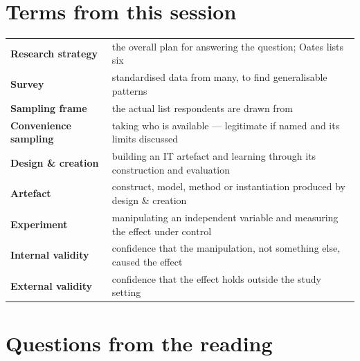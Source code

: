 \documentclass[11pt,a4paper,british,twoside=false,headings=small,chapterprefix=false,numbers=noenddot]{scrbook}
\begin{document}
\section*{Terms from this session}
\begin{center}\small
\footnotesize
  \renewcommand{\arraystretch}{1.18}
  \begin{tabular}{@{}p{3.6cm}p{9.9cm}@{}}
    \toprule
    \textbf{Research strategy} & the overall plan for answering the question; Oates lists six\\
    \textbf{Survey} & standardised data from many, to find generalisable patterns\\
    \textbf{Sampling frame} & the actual list respondents are drawn from\\
    \textbf{Convenience sampling} & taking who is available --- legitimate if named and its limits discussed\\
    \textbf{Design \& creation} & building an IT artefact and learning through its construction and evaluation\\
    \textbf{Artefact} & construct, model, method or instantiation produced by design \& creation\\
    \textbf{Experiment} & manipulating an independent variable and measuring the effect under control\\
    \textbf{Internal validity} & confidence that the manipulation, not something else, caused the effect\\
    \textbf{External validity} & confidence that the effect holds outside the study setting\\
    \bottomrule
  \end{tabular}
\end{center}



\section*{Questions from the reading}
\end{document}
